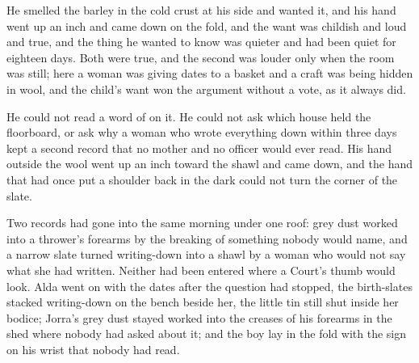 He smelled the barley in the cold crust at his side and wanted it, and his hand went up an inch and came down on the fold, and the want was childish and loud and true, and the thing he wanted to know was quieter and had been quiet for eighteen days. Both were true, and the second was louder only when the room was still; here a woman was giving dates to a basket and a craft was being hidden in wool, and the child's want won the argument without a vote, as it always did.

He could not read a word of  on it. He could not ask which house held the floorboard, or ask why a woman who wrote everything down within three days kept a second record that no mother and no officer would ever read. His hand outside the wool went up an inch toward the shawl and came down, and the hand that had once put a shoulder back in the dark could not turn the corner of the slate.

Two records had gone into the same morning under one roof: grey dust worked into a thrower's forearms by the breaking of something nobody would name, and a narrow slate turned writing-down into a shawl by a woman who would not say what she had written. Neither had been entered where a Court's thumb would look. Alda went on with the dates after the question had stopped, the birth-slates stacked writing-down on the bench beside her, the little tin still shut inside her bodice; Jorra's grey dust stayed worked into the creases of his forearms in the shed where nobody had asked about it; and the boy lay in the fold with the sign on his wrist that nobody had read.
